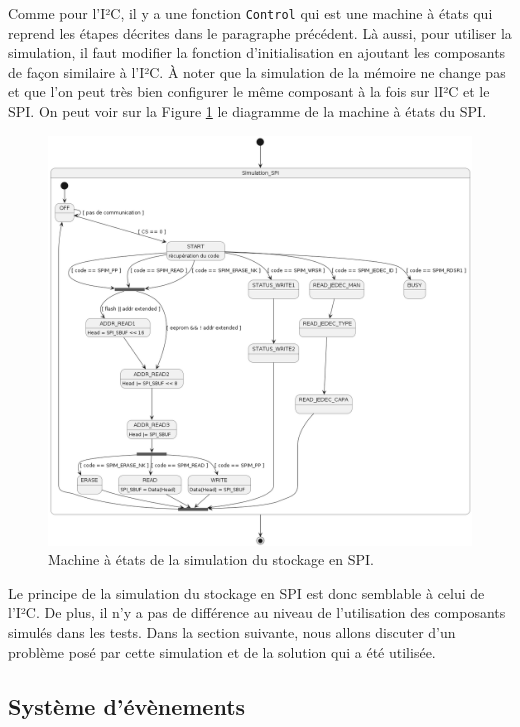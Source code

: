 \documentclass[a4paper]{article}
\begin{document}
Comme pour l'I²C, il y a une fonction \verb|Control| qui est une machine à états
qui reprend les étapes décrites dans le paragraphe précédent. Là aussi, pour
utiliser la simulation, il faut modifier la fonction d'initialisation en
ajoutant les composants de façon similaire à l'I²C. À noter que la simulation de
la mémoire ne change pas et que l'on peut très bien configurer le même composant
à la fois sur lI²C et le SPI. On peut voir sur la Figure \ref{fig:smspi} le
diagramme de la machine à états du SPI.

\begin{figure}[h!]
  \begin{center}
    \includegraphics[scale=0.4]{./graphs/sm-spi.png}
    \caption{Machine à états de la simulation du stockage en SPI.}
    \label{fig:smspi}
  \end{center}
\end{figure}

Le principe de la simulation du stockage en SPI est donc semblable à celui de
l'I²C. De plus, il n'y a pas de différence au niveau de l'utilisation des
composants simulés dans les tests. Dans la section suivante, nous allons discuter
d'un problème posé par cette simulation et de la solution qui a été utilisée.
\subsection{Système d'évènements}%
\end{document}
